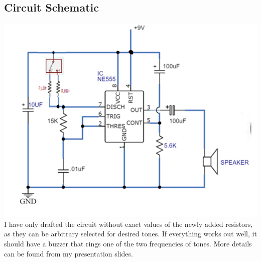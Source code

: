 \documentclass{article}
\begin{document}
	\subsection{Circuit Schematic}
	\includegraphics[width=\columnwidth]{SCHE_MODI}
	I have only drafted the circuit without exact values of the newly added resistors, as they can be arbitrary selected for desired tones.
	If everything works out well, it should have a buzzer that rings one of the two frequencies of tones. More details can be found from my presentation slides.
\end{document}
